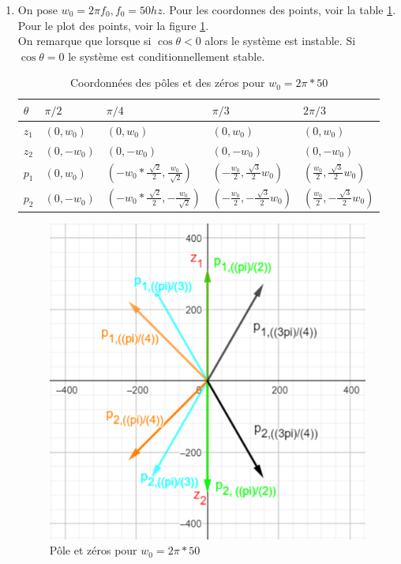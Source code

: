 \documentclass{article}
\theoremstyle{plain}%
\theoremstyle{definition}
\theoremstyle{remark}
\begin{document}
\begin{enumerate}
    \item On pose $ w_0 = 2 \pi f_0, f_0 = 50hz $. Pour les coordonnes des points, voir la table \ref*{pt}. Pour le plot des points, voir la figure \ref{plot_pt}.\\
    On remarque que lorsque si $ \cos \theta  < 0 $ alors le système est instable. Si $ \cos \theta =0 $ le système est conditionnellement stable.
    \begin{table}[!ht]
        \centering
        \begin{tabular}{|l|l|l|l|l|}
        \hline
            $\theta$ & $\pi/2$ & $\pi/4$                                                & $\pi/3$                                           & $ 2\pi /3 $   \\ \hline
            $z_1$ & $(0,w_0)$   & $(0,w_0)$                                             & $(0,w_0)$                                         & $(0,w_0)$     \\ \hline
            $z_2$ & $(0, -w_0)$ & $(0, -w_0)$                                           & $(0, -w_0)$                                       & $(0, -w_0)$   \\ \hline
            $p_1$ & $(0, w_0)$  & $(-w_0*\frac{\sqrt[]{2}}{2}, \frac{w_0}{\sqrt[]{2}})$  & $(-\frac{w_0}{2}, \frac{\sqrt[]{3}}{2}w_0)$      & $(\frac{w_0}{2}, \frac{\sqrt[]{3}}{2}w_0)$ \\ \hline
            $p_2$ & $(0, -w_0)$ & $(-w_0*\frac{\sqrt[]{2}}{2}, -\frac{w_0}{\sqrt[]{2}})$  & $(-\frac{w_0}{2}, -\frac{\sqrt[]{3}}{2}w_0)$    & $(\frac{w_0}{2}, -\frac{\sqrt[]{3}}{2}w_0)$ \\ \hline
        \end{tabular}
        \caption{Coordonnées des pôles et des zéros pour $ w_0 = 2 \pi * 50 $}
        \label{pt}
    \end{table}
    \begin{figure}[htbp]
        \centering
        \includegraphics*[width=.75\textwidth]{./pole_zero.png}
        \caption{Pôle et zéros pour $ w_0 = 2 \pi * 50 $ }
        \label{plot_pt}
    \end{figure}



\end{enumerate}
\end{document}
